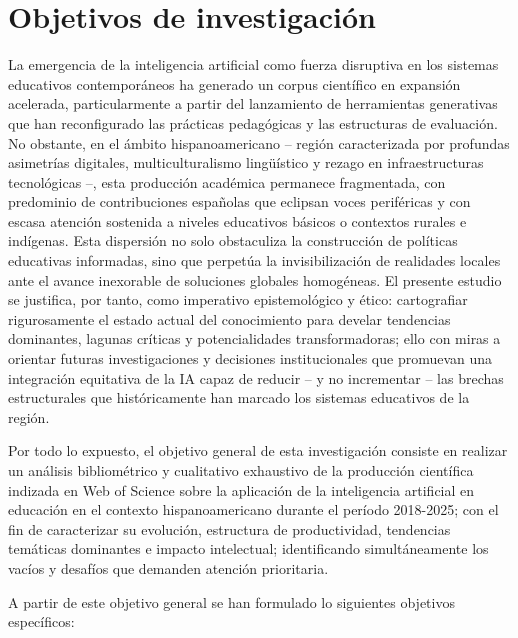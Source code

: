 \documentclass[spanish]{textolivre}
\begin{document}
\section{Objetivos de investigación}
La emergencia de la inteligencia artificial como fuerza disruptiva en los sistemas educativos contemporáneos ha generado un corpus científico en expansión acelerada, particularmente a partir del lanzamiento de herramientas generativas que han reconfigurado las prácticas pedagógicas y las estructuras de evaluación. No obstante, en el ámbito hispanoamericano -- región caracterizada por profundas asimetrías digitales, multiculturalismo lingüístico y rezago en infraestructuras tecnológicas --, esta producción académica permanece fragmentada, con predominio de contribuciones españolas que eclipsan voces periféricas y con escasa atención sostenida a niveles educativos básicos o contextos rurales e indígenas. Esta dispersión no solo obstaculiza la construcción de políticas educativas informadas, sino que perpetúa la invisibilización de realidades locales ante el avance inexorable de soluciones globales homogéneas. El presente estudio se justifica, por tanto, como imperativo epistemológico y ético: cartografiar rigurosamente el estado actual del conocimiento para develar tendencias dominantes, lagunas críticas y potencialidades transformadoras; ello con miras a orientar futuras investigaciones y decisiones institucionales que promuevan una integración equitativa de la IA capaz de reducir -- y no incrementar -- las brechas estructurales que históricamente han marcado los sistemas educativos de la región.

Por todo lo expuesto, el objetivo general de esta investigación consiste en realizar un análisis bibliométrico y cualitativo exhaustivo de la producción científica indizada en Web of Science sobre la aplicación de la inteligencia artificial en educación en el contexto hispanoamericano durante el período 2018-2025; con el fin de caracterizar su evolución, estructura de productividad, tendencias temáticas dominantes e impacto intelectual; identificando simultáneamente los vacíos y desafíos que demanden atención prioritaria.

A partir de este objetivo general se han formulado lo siguientes objetivos específicos:
\end{document}
